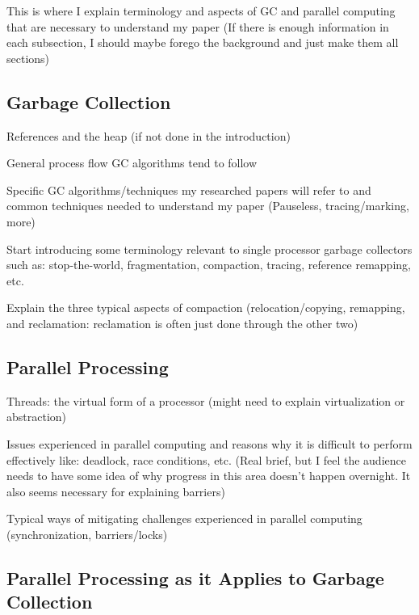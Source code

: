 \documentclass{sig-alternate}
\begin{document}

This is where I explain terminology and aspects of GC and parallel 
computing that are necessary to understand my paper (If there is 
enough information in each subsection, I should maybe forego the 
background and just make them all sections)

\subsection{Garbage Collection}
\label{sec:garbageCollection}

References and the heap (if not done in the introduction)

General process flow GC algorithms tend to follow

Specific GC algorithms/techniques my researched papers will 
refer to and common techniques needed to understand my paper 
(Pauseless, tracing/marking, more)

Start introducing some terminology relevant to single processor 
garbage collectors such as: stop-the-world, fragmentation, compaction, 
tracing, reference remapping, etc.

Explain the three typical aspects of compaction 
(relocation/copying, remapping, and reclamation: 
reclamation is often just done through the other two)

\subsection{Parallel Processing}
\label{sec:parallelProcessing}

Threads: the virtual form of a processor (might need to 
explain virtualization or abstraction)

Issues experienced in parallel computing and reasons why it 
is difficult to perform effectively like: deadlock, race conditions, 
etc. (Real brief, but I feel the audience needs to have some idea of 
why progress in this area doesn't happen overnight. It also seems 
necessary for explaining barriers)

Typical ways of mitigating challenges experienced in parallel 
computing (synchronization, barriers/locks)

\subsection{Parallel Processing as it Applies to Garbage Collection}
\label{sec:parallelProcessingGarbageCollection}
\end{document}
